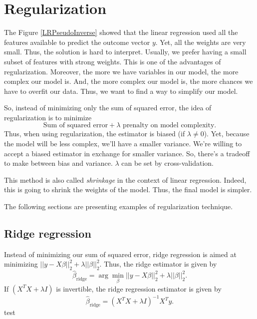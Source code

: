 \documentclass[a4paper,12pt]{article}
\begin{document}
\section{Regularization}
The Figure \ref{LRPseudoInverse} showed that the linear regression used all the features available to predict the outcome vector $y$. Yet, all the weights are very small. Thus, the solution is hard to interpret. Usually, we prefer having a small subset of features with strong weights. This is one of the advantages of regularization. Moreover, the more we have variables in our model, the more complex our model is. And, the more complex our model is, the more chances we have to overfit our data. Thus, we want to find a way to simplify our model.

 So, instead of minimizing only the sum of squared error, the idea of regularization is to minimize
 \[ \text{Sum of squared error} + \lambda \text{ prenalty on model complexity}.\]
Thus, when using regularization, the estimator is biased (if $\lambda \not = 0$). Yet, because the model will be less complex, we'll have a smaller variance. We're willing to accept a biased estimator in exchange for smaller variance. So, there's a tradeoff to make between bias and variance. $\lambda$ can be set by cross-validation.

This method is also called \emph{shrinkage} in the context of linear regression. Indeed, this is going to shrink the weights of the model. Thus, the final model is simpler.

The following sections are presenting examples of regularization technique.

\subsection{Ridge regression}
Instead of minimizing our sum of squared error, ridge regression is aimed at minimizing $||y - X\beta||_2^2 + \lambda ||\beta||_2^2$. Thus, the ridge estimator is given by
\[ \hat{\beta}_\text{ridge} = \arg \min_\beta ||y - X\beta||_2^2 + \lambda ||\beta||_2^2. \]
\thm If $(X^T X + \lambda I)$ is invertible, the ridge regression estimator is given by
\[ \hat{\beta}_\text{ridge} = (X^T X+ \lambda I)^{-1} X^T y. \]
\proof test
\end{document}
